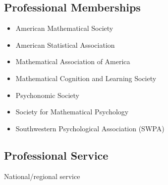 \documentclass[article,10pt]{article}
\begin{document}
\subsection*{Professional Memberships}
\label{sec:org7628226}
\begin{itemize}
\item American Mathematical Society
\item American Statistical Association
\item Mathematical Association of America
\item Mathematical Cognition and Learning Society
\item Psychonomic Society
\item Society for Mathematical Psychology
\item Southwestern Psychological Association (SWPA)
\end{itemize}

\subsection*{Professional Service}
\label{sec:orga87deb4}

National/regional service 
\end{document}
